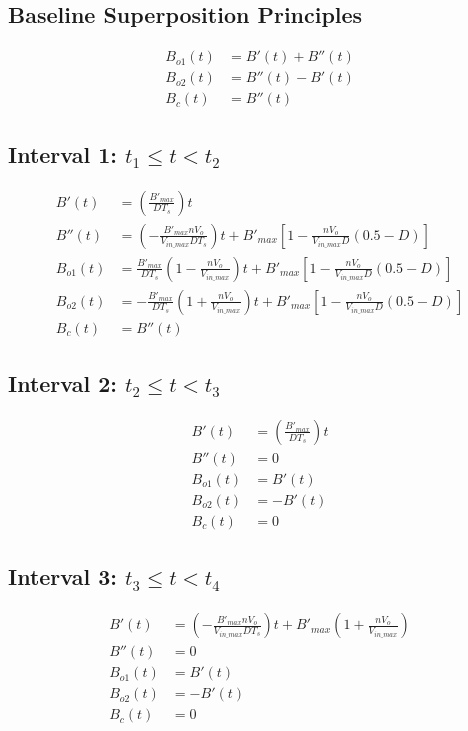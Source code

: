 \documentclass{article}
\begin{document}
\subsection*{Baseline Superposition Principles}
\begin{align}
    B_{o1}(t) &= B'(t) + B''(t) \\
    B_{o2}(t) &= B''(t) - B'(t) \\
    B_c(t) &= B''(t)
\end{align}

\subsection*{Interval 1: $t_1 \le t < t_2$}
\begin{align}
    B'(t) &= \left( \frac{B'_{max}}{D T_s} \right) t \\
    B''(t) &= \left( - \frac{B'_{max} n V_o}{V_{in\_max} D T_s} \right) t + B'_{max} \left[ 1 - \frac{n V_o}{V_{in\_max} D} (0.5 - D) \right] \\
    B_{o1}(t) &= \frac{B'_{max}}{D T_s} \left( 1 - \frac{n V_o}{V_{in\_max}} \right) t + B'_{max} \left[ 1 - \frac{n V_o}{V_{in\_max} D} (0.5 - D) \right] \\
    B_{o2}(t) &= - \frac{B'_{max}}{D T_s} \left( 1 + \frac{n V_o}{V_{in\_max}} \right) t + B'_{max} \left[ 1 - \frac{n V_o}{V_{in\_max} D} (0.5 - D) \right] \\
    B_c(t) &= B''(t)
\end{align}

\subsection*{Interval 2: $t_2 \le t < t_3$}
\begin{align}
    B'(t) &= \left( \frac{B'_{max}}{D T_s} \right) t \\
    B''(t) &= 0 \\
    B_{o1}(t) &= B'(t) \\
    B_{o2}(t) &= -B'(t) \\
    B_c(t) &= 0
\end{align}

\subsection*{Interval 3: $t_3 \le t < t_4$}
\begin{align}
    B'(t) &= \left( - \frac{B'_{max} n V_o}{V_{in\_max} D T_s} \right) t + B'_{max} \left( 1 + \frac{n V_o}{V_{in\_max}} \right) \\
    B''(t) &= 0 \\
    B_{o1}(t) &= B'(t) \\
    B_{o2}(t) &= -B'(t) \\
    B_c(t) &= 0
\end{align}
\end{document}
